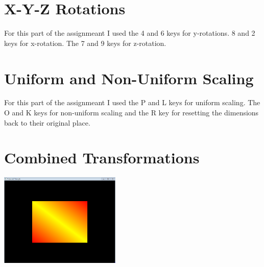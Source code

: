 \documentclass{article}
\begin{document}
\section{X-Y-Z Rotations}
For this part of the assignmeant I used the 4 and 6 keys for y-rotations. 8 and 2 keys for x-rotation. The 7 and 9 keys for z-rotation. 

\section{Uniform and Non-Uniform Scaling}
For this part of the assignmeant I used the P and L keys for uniform scaling. The O and K keys for non-uniform scaling and the R key for resetting the dimensions back to their original place. 

\section{Combined Transformations}







\includegraphics[height=1.75in]{square.PNG}


\pagebreak

	
\end{document}

